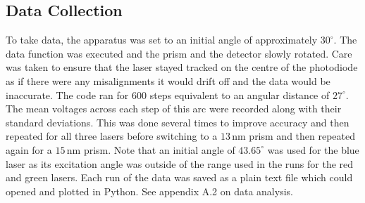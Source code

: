 \documentclass[%
reprint,
amsmath,amssymb,
aps,
]{revtex4-2}
\begin{document}
		\subsection{Data Collection}
			To take data, the apparatus was set to an initial angle of approximately $30^\circ$. The data function was executed and the prism and the detector slowly rotated. Care was taken to ensure that the laser stayed tracked on the centre of the photodiode as if there were any misalignments it would drift off and the data would be inaccurate. The code ran for $600$ steps equivalent to an angular distance of $27^\circ$. The mean voltages across each step of this arc were recorded along with their standard deviations. This was done several times to improve accuracy and then repeated for all three lasers before switching to a $13\,\text{nm}$ prism and then repeated again for a $15\,\text{nm}$ prism. Note that an initial angle of $43.65^\circ$ was used for the blue laser as its excitation angle was outside of the range used in the runs for the red and green lasers. Each run of the data was saved as a plain text file which could opened and plotted in Python. See appendix A.2 on data analysis.
		
\end{document}
